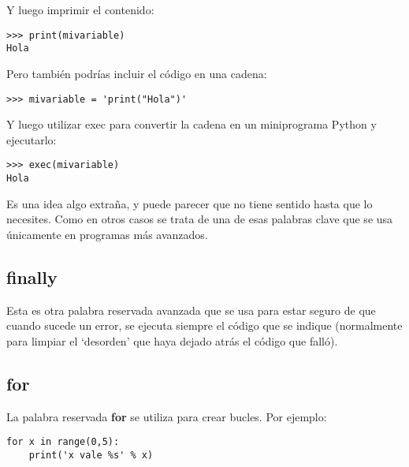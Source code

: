 \noindent
Y luego imprimir el contenido:

\begin{listing}
\begin{verbatim}
>>> print(mivariable)
Hola
\end{verbatim}
\end{listing}

\noindent
Pero también podrías incluir el código en una cadena:

\begin{listing}
\begin{verbatim}
>>> mivariable = 'print("Hola")'
\end{verbatim}
\end{listing}

\noindent
Y luego utilizar exec para convertir la cadena en un miniprograma Python y ejecutarlo:

\begin{listing}
\begin{verbatim}
>>> exec(mivariable)
Hola
\end{verbatim}
\end{listing}

Es una idea algo extraña, y puede parecer que no tiene sentido hasta que lo necesites.  Como en otros casos se trata de una de esas palabras clave que se usa únicamente en programas más avanzados.

\subsection*{finally}

Esta es otra palabra reservada avanzada que se usa para estar seguro de que cuando sucede un error, se ejecuta siempre el código que se indique (normalmente para limpiar el `desorden' que haya dejado atrás el código que falló). 

\subsection*{for}

La palabra reservada \textbf{for} se utiliza para crear bucles. Por ejemplo:

\begin{listing}
\begin{verbatim}
for x in range(0,5):
    print('x vale %s' % x)
\end{verbatim}
\end{listing}

